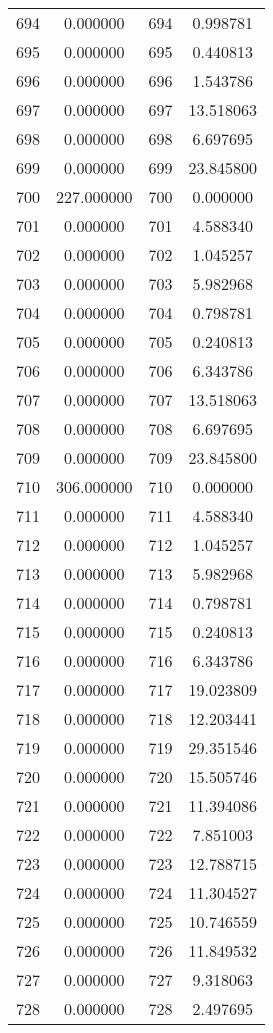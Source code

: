 \documentclass[12pt]{article}
\begin{document}
\begin{longtable}{@{}cccc@{}}
694 & 0.000000 & 694 & 0.998781 \\
695 & 0.000000 & 695 & 0.440813 \\
696 & 0.000000 & 696 & 1.543786 \\
697 & 0.000000 & 697 & 13.518063 \\
698 & 0.000000 & 698 & 6.697695 \\
699 & 0.000000 & 699 & 23.845800 \\
700 & 227.000000 & 700 & 0.000000 \\
701 & 0.000000 & 701 & 4.588340 \\
702 & 0.000000 & 702 & 1.045257 \\
703 & 0.000000 & 703 & 5.982968 \\
704 & 0.000000 & 704 & 0.798781 \\
705 & 0.000000 & 705 & 0.240813 \\
706 & 0.000000 & 706 & 6.343786 \\
707 & 0.000000 & 707 & 13.518063 \\
708 & 0.000000 & 708 & 6.697695 \\
709 & 0.000000 & 709 & 23.845800 \\
710 & 306.000000 & 710 & 0.000000 \\
711 & 0.000000 & 711 & 4.588340 \\
712 & 0.000000 & 712 & 1.045257 \\
713 & 0.000000 & 713 & 5.982968 \\
714 & 0.000000 & 714 & 0.798781 \\
715 & 0.000000 & 715 & 0.240813 \\
716 & 0.000000 & 716 & 6.343786 \\
717 & 0.000000 & 717 & 19.023809 \\
718 & 0.000000 & 718 & 12.203441 \\
719 & 0.000000 & 719 & 29.351546 \\
720 & 0.000000 & 720 & 15.505746 \\
721 & 0.000000 & 721 & 11.394086 \\
722 & 0.000000 & 722 & 7.851003 \\
723 & 0.000000 & 723 & 12.788715 \\
724 & 0.000000 & 724 & 11.304527 \\
725 & 0.000000 & 725 & 10.746559 \\
726 & 0.000000 & 726 & 11.849532 \\
727 & 0.000000 & 727 & 9.318063 \\
728 & 0.000000 & 728 & 2.497695 \\

\end{longtable}
\end{document}
